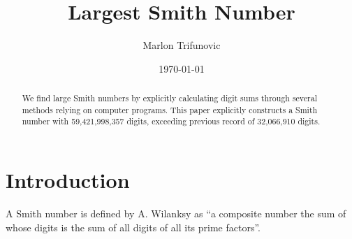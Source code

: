 \documentclass{amsart}
\numberwithin{equation}{section}
\theoremstyle{plain} %
\theoremstyle{definition}
\theoremstyle{remark}
\begin{document}
\title{Largest Smith Number}


\author{Marlon Trifunovic}

\address{}






\date{\today}

 \begin{abstract}
We find large Smith numbers by explicitly calculating digit sums through several methods relying on computer programs. This paper explicitly constructs a Smith number with 59,421,998,357 digits, exceeding previous record of 32,066,910 digits.
 \end{abstract}


\maketitle

 \tableofcontents


 \section{Introduction}

A Smith number is defined by A. Wilanksy as ``a composite number the sum of whose digits is the sum of all digits of all its prime factors''\cite{Wilansky1982}.
\end{document}
